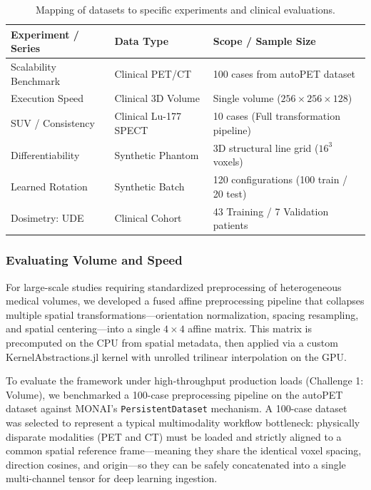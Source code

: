 \documentclass[10pt,letterpaper]{article}
\begin{document}
\begin{table}[H]
\centering
\caption{Mapping of datasets to specific experiments and clinical evaluations.}
\label{tab:dataset_mapping}
\renewcommand{\arraystretch}{1.2}
\begin{tabular}{|p{}|p{}|p{}|}
\hline
\textbf{Experiment / Series} & \textbf{Data Type} & \textbf{Scope / Sample Size} \\
\hline
Scalability Benchmark & Clinical PET/CT & 100 cases from autoPET dataset \cite{Dexl_2025} \\
\hline
Execution Speed & Clinical 3D Volume & Single volume ($256 \times 256 \times 128$) \\
\hline
SUV / Consistency & Clinical Lu-177 SPECT & 10 cases (Full transformation pipeline) \\
\hline
Differentiability & Synthetic Phantom & 3D structural line grid ($16^3$ voxels) \\
\hline
Learned Rotation & Synthetic Batch & 120 configurations (100 train / 20 test) \\
\hline
Dosimetry: UDE & Clinical Cohort & 43 Training / 7 Validation patients \\
\hline
\end{tabular}
\end{table}

\subsubsection*{Evaluating Volume and Speed}
For large-scale studies requiring standardized preprocessing of heterogeneous medical volumes, we developed a fused affine preprocessing pipeline that collapses multiple spatial transformations---orientation normalization, spacing resampling, and spatial centering---into a single $4 \times 4$ affine matrix. This matrix is precomputed on the CPU from spatial metadata, then applied via a custom KernelAbstractions.jl kernel with unrolled trilinear interpolation on the GPU.

To evaluate the framework under high-throughput production loads (Challenge 1: Volume), we benchmarked a 100-case preprocessing pipeline on the autoPET dataset \cite{Dexl_2025} against MONAI's \texttt{PersistentDataset} mechanism. A 100-case dataset was selected to represent a typical multimodality workflow bottleneck: physically disparate modalities (PET and CT) must be loaded and strictly aligned to a common spatial reference frame---meaning they share the identical voxel spacing, direction cosines, and origin---so they can be safely concatenated into a single multi-channel tensor for deep learning ingestion. 
\end{document}
